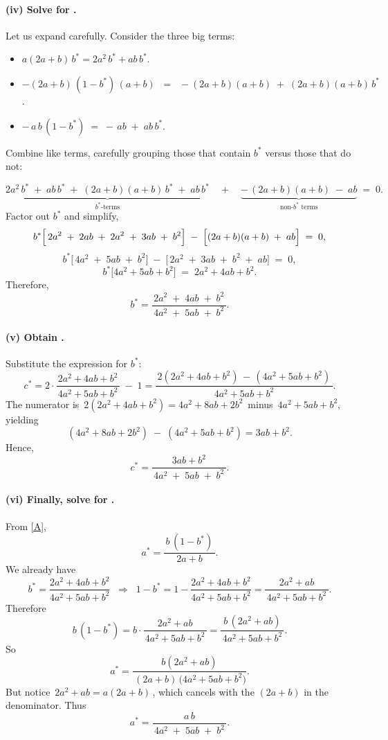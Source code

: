 \documentclass{article}
\begin{document}
\paragraph{(iv) Solve for .}
Let us expand carefully.  Consider the three big terms:

\begin{itemize}
\item $a(2a+b)\,b^* = 2a^2\,b^* + a b\,b^*$.
\item $-(2a+b)\,(1-b^*)\,(a+b)\;\;=\;\;-(2a+b)(a+b) \;+\;(2a+b)(a+b)\,b^*$.
\item $-\,a\,b\,(1-b^*) \;=\; -\,a b \;+\; a b\,b^*$.
\end{itemize}
Combine like terms, carefully grouping those that contain $b^*$ versus those that do not:

\[
\underbrace{
2a^2\,b^*
\;+\;
a b\,b^*
\;+\;
(2a+b)(a+b)\,b^*
\;+\;
a b\,b^*
}_{\text{$b^*$-terms}}
\quad+\quad
\underbrace{
-\,(2a+b)(a+b)
\;-\;
a b
}_{\text{non-$b^*$ terms}}
\;=\;0.
\]
Factor out $b^*$ and simplify,
\[
b^*\Bigl[\,
2a^2 \;+\; 2ab \;+\; 2a^2 \;+\; 3ab \;+\; b^2
\Bigr]
\;-\;
\Bigl[
(2a+b)(a+b) \;+\; a b
\Bigr]
\;=\;0,
\]
\[
b^*\bigl[\,4a^2 \;+\;5ab \;+\; b^2\bigr]
\;-\;
\bigl[\,2a^2 \;+\;3ab \;+\; b^2 \;+\; a b\bigr]
\;=\;0,
\]
\[
b^*\bigl[4a^2 +5ab + b^2\bigr]
\;=\;
2a^2 +4ab + b^2.
\]
Therefore, 
\[
\boxed{
b^*
= \frac{\,2a^2 \;+\;4ab \;+\; b^2\,}{\,4a^2 \;+\;5ab \;+\; b^2\,}.
}
\]

\paragraph{(v) Obtain .}
Substitute the expression for $b^*$:
\[
c^*
= 2 \cdot \frac{\,2a^2 +4ab + b^2\,}{\,4a^2 +5ab + b^2\,}
\;-\;
1
= \frac{\,2(2a^2 +4ab + b^2)\, -\, (4a^2 +5ab + b^2)\,}{\,4a^2 +5ab + b^2\,}.
\]
The numerator is $\,2(2a^2 +4ab + b^2) = 4a^2 +8ab +2b^2\,$ minus $\,4a^2 +5ab + b^2$, yielding 
\[
(4a^2 +8ab +2b^2) \;-\; (4a^2 +5ab + b^2)
= 3ab + b^2.
\]
Hence,
\[
\boxed{
c^*
= \frac{\,3ab + b^2\,}{\,4a^2 \;+\;5ab \;+\; b^2\,}.
}
\]


\paragraph{(vi) Finally, solve for .}
From \eqref{A},
\[
a^*
= \frac{\,b\,(1-b^*)\,}{\,2a + b\,}.
\]
We already have
\[
b^*
= \frac{2a^2 +4ab + b^2}{4a^2 +5ab + b^2}
\;\;\Longrightarrow\;\;
1 - b^*
= 1
- \frac{2a^2 +4ab + b^2}{4a^2 +5ab + b^2}
= \frac{\,2a^2 + ab\,}{\,4a^2 +5ab + b^2\,}.
\]
Therefore
\[
b\,(1-b^*)
= b \cdot \frac{\,2a^2 + ab\,}{\,4a^2 +5ab + b^2\,}
= \frac{\,b\,(2a^2 + ab)\,}{\,4a^2 +5ab + b^2\,}.
\]
So
\[
a^*
= \frac{\,b(2a^2 + ab)\,}{\,(2a+b)\,\bigl(4a^2 +5ab + b^2\bigr)}.
\]
But notice $\,2a^2 + ab = a(2a + b)\,$, which cancels with the $(2a+b)$ in the denominator.  Thus
\[
\boxed{
a^*
= \frac{\,a\,b\,}{\,4a^2 \;+\;5ab \;+\; b^2\,}.
}
\]
\end{document}
